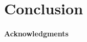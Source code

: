 \documentclass[preprint,9pt]{sigplanconf} %
\begin{document}


\section{Conclusion}


\paragraph{Acknowledgments}


\balance



\end{document}
